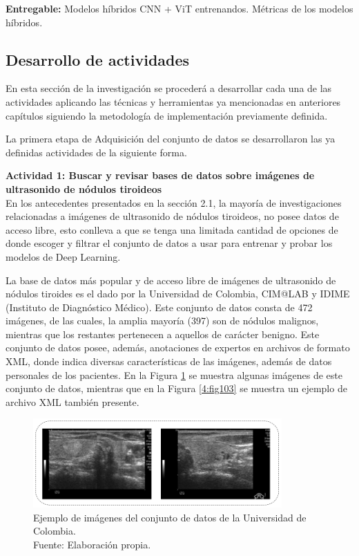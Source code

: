 \textbf{Entregable:} Modelos híbridos CNN + ViT entrenandos. Métricas de los modelos híbridos.
\\

\subsection{Desarrollo de actividades}

En esta sección de la investigación se procederá a desarrollar cada una de las actividades aplicando las técnicas y herramientas ya mencionadas en anteriores capítulos siguiendo la metodología de implementación previamente definida.

La primera etapa de Adquisición del conjunto de datos se desarrollaron las ya definidas actividades de la siguiente forma.

\textbf{Actividad 1: Buscar y revisar bases de datos sobre imágenes de ultrasonido de nódulos tiroideos}
\\
En los antecedentes presentados en la sección 2.1, la mayoría de investigaciones relacionadas a imágenes de ultrasonido de nódulos tiroideos, no posee datos de acceso libre, esto conlleva a que se tenga una limitada cantidad de opciones de donde escoger y filtrar el conjunto de datos a usar para entrenar y probar los modelos de Deep Learning.

La base de datos más popular y de acceso libre de imágenes de ultrasonido de nódulos tiroides es el dado por la Universidad de Colombia, CIM@LAB y IDIME (Instituto de Diagnóstico Médico). Este conjunto de datos consta de 472 imágenes, de las cuales, la amplia mayoría (397) son de nódulos malignos, mientras que los restantes pertenecen a aquellos de carácter benigno. Este conjunto de datos posee, además, anotaciones de expertos en archivos de formato XML, donde indica diversas características de las imágenes, además de datos personales de los pacientes. En la Figura \ref{4:fig102} se muestra algunas imágenes de este conjunto de datos, mientras que en la Figura \ref{4:fig103} se muestra un ejemplo de archivo XML también presente.

\begin{figure}[H]
	\begin{center}
		\includegraphics[width=0.85\textwidth]{4/figures/nodule_ddti.png}
		\caption[Ejemplo de imágenes del conjunto de datos de la Universidad de Colombia]{Ejemplo de imágenes del conjunto de datos de la Universidad de Colombia. \\
		Fuente: Elaboración propia.}
		\label{4:fig102}
	\end{center}
\end{figure}

